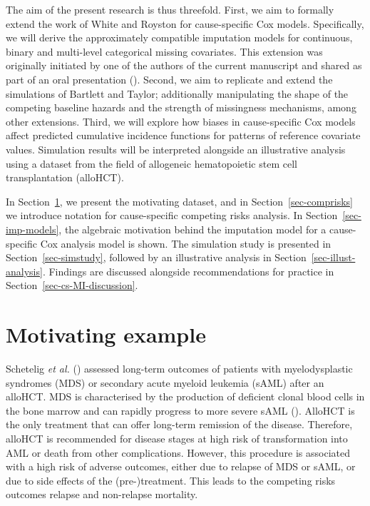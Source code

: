 \documentclass[
  letterpaper,
  DIV=11,
  numbers=noendperiod]{scrreprt}
\begin{document}
The aim of the present research is thus threefold. First, we aim to
formally extend the work of White and Royston for cause-specific Cox
models. Specifically, we will derive the approximately compatible
imputation models for continuous, binary and multi-level categorical
missing covariates. This extension was originally initiated by one of
the authors of the current manuscript and shared as part of an oral
presentation
(). Second, we aim to replicate and extend the
simulations of Bartlett and Taylor; additionally manipulating the shape
of the competing baseline hazards and the strength of missingness
mechanisms, among other extensions. Third, we will explore how biases in
cause-specific Cox models affect predicted cumulative incidence
functions for patterns of reference covariate values. Simulation results
will be interpreted alongside an illustrative analysis using a dataset
from the field of allogeneic hematopoietic stem cell transplantation
(alloHCT).

In Section~\ref{sec-motivating-example}, we present the motivating
dataset, and in Section~\ref{sec-comprisks} we introduce notation for
cause-specific competing risks analysis. In
Section~\ref{sec-imp-models}, the algebraic motivation behind the
imputation model for a cause-specific Cox analysis model is shown. The
simulation study is presented in Section~\ref{sec-simstudy}, followed by
an illustrative analysis in Section~\ref{sec-illust-analysis}. Findings
are discussed alongside recommendations for practice in
Section~\ref{sec-cs-MI-discussion}.

\section{Motivating example}\label{sec-motivating-example}

Schetelig \emph{et al.}
()
assessed long-term outcomes of patients with myelodysplastic syndromes
(MDS) or secondary acute myeloid leukemia (sAML) after an alloHCT. MDS
is characterised by the production of deficient clonal blood cells in
the bone marrow and can rapidly progress to more severe sAML
(). AlloHCT is the only treatment that can offer long-term remission
of the disease. Therefore, alloHCT is recommended for disease stages at
high risk of transformation into AML or death from other complications.
However, this procedure is associated with a high risk of adverse
outcomes, either due to relapse of MDS or sAML, or due to side effects
of the (pre-)treatment. This leads to the competing risks outcomes
relapse and non-relapse mortality.
\end{document}
